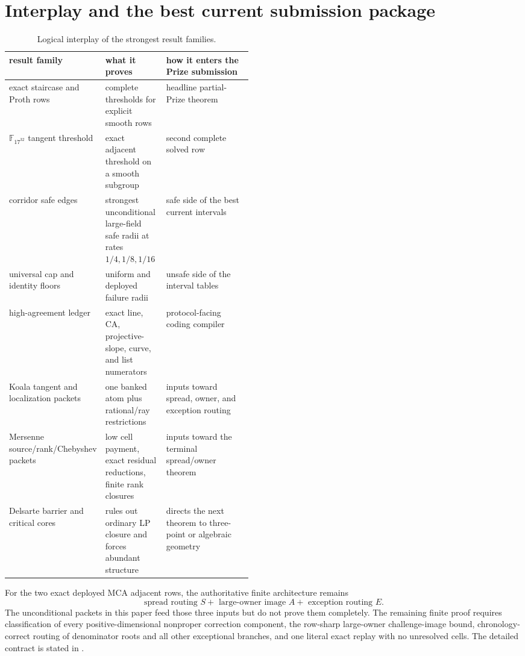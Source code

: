 \documentclass[11pt,a4paper]{amsart}
\numberwithin{equation}{section}
\theoremstyle{remark}
\newcommand{\F}{\mathbb F}
\begin{document}
\section{Interplay and the best current submission package}

\begin{table}[ht]
\centering
\caption{Logical interplay of the strongest result families.}
\label{tab:interplay}
\footnotesize
\begin{tabularx}{\textwidth}{@{}p{0.22\linewidth}p{0.25\linewidth}X@{}}
\toprule
result family & what it proves & how it enters the Prize submission\\
\midrule
exact staircase and Proth rows & complete thresholds for explicit smooth rows & headline partial-Prize theorem\\
$\F_{17^{32}}$ tangent threshold & exact adjacent threshold on a smooth subgroup & second complete solved row\\
corridor safe edges & strongest unconditional large-field safe radii at rates $1/4,1/8,1/16$ & safe side of the best current intervals\\
universal cap and identity floors & uniform and deployed failure radii & unsafe side of the interval tables\\
high-agreement ledger & exact line, CA, projective-slope, curve, and list numerators & protocol-facing coding compiler\\
Koala tangent and localization packets & one banked atom plus rational/ray restrictions & inputs toward spread, owner, and exception routing\\
Mersenne source/rank/Chebyshev packets & low cell payment, exact residual reductions, finite rank closures & inputs toward the terminal spread/owner theorem\\
Delsarte barrier and critical cores & rules out ordinary LP closure and forces abundant structure & directs the next theorem to three-point or algebraic geometry\\
\bottomrule
\end{tabularx}
\end{table}

For the two exact deployed MCA adjacent rows, the authoritative finite architecture remains
\[
 \boxed{\text{spread routing }S+\text{ large-owner image }A+\text{ exception routing }E.}
\]
The unconditional packets in this paper feed those three inputs but do not prove them completely.  The remaining finite proof requires classification of every positive-dimensional nonproper correction component, the row-sharp large-owner challenge-image bound, chronology-correct routing of denominator roots and all other exceptional branches, and one literal exact replay with no unresolved cells.  The detailed contract is stated in \cite{ChoComp26}.
\end{document}
